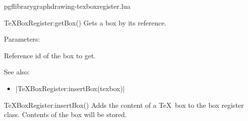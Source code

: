 
\begin{filedescription}{pgflibrarygraphdrawing-texboxregister.lua}


\begin{luacommand}{{TeXBoxRegister:getBox}()}
Gets a box by its reference.

Parameters:
\begin{parameterdescription}
	\item[\meta{boxReference}] Reference id of the box to get.
\end{parameterdescription}



See also:
\begin{itemize}
	\item[] |TeXBoxRegister:insertBox(texbox)|
\end{itemize}

\end{luacommand}\begin{luacommand}{{TeXBoxRegister:insertBox}()}
Adds the content of a \TeX\ box to the box register class. Contents of the box will be stored. 



\end{luacommand}
\end{filedescription}